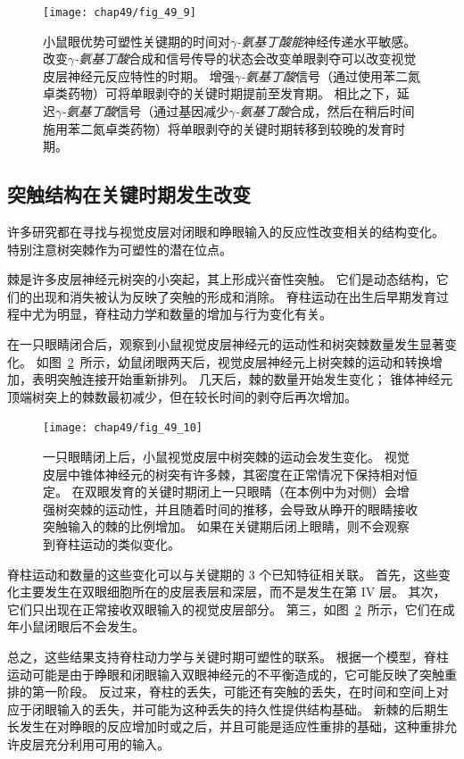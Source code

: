 \begin{figure}[htbp]
	\centering
	\texttt{[image: chap49/fig\_49\_9]}
	\caption{小鼠眼优势可塑性关键期的时间对\textit{$\gamma$-氨基丁酸能}神经传递水平敏感。
		改变\textit{$\gamma$-氨基丁酸}合成和信号传导的状态会改变单眼剥夺可以改变视觉皮层神经元反应特性的时期。
		增强\textit{$\gamma$-氨基丁酸}信号（通过使用苯二氮卓类药物）可将单眼剥夺的关键时期提前至发育期。
		相比之下，延迟\textit{$\gamma$-氨基丁酸}信号（通过基因减少\textit{$\gamma$-氨基丁酸}合成，然后在稍后时间施用苯二氮卓类药物）将单眼剥夺的关键时期转移到较晚的发育时期\cite{daw1998critical}。}
	\label{fig:49_9}
\end{figure}



\subsection{突触结构在关键时期发生改变}

许多研究都在寻找与视觉皮层对闭眼和睁眼输入的反应性改变相关的结构变化。
特别注意树突棘作为可塑性的潜在位点。


棘是许多皮层神经元树突的小突起，其上形成兴奋性突触。
它们是动态结构，它们的出现和消失被认为反映了突触的形成和消除。
脊柱运动在出生后早期发育过程中尤为明显，脊柱动力学和数量的增加与行为变化有关。


在一只眼睛闭合后，观察到小鼠视觉皮层神经元的运动性和树突棘数量发生显著变化。
如图~\ref{fig:49_10}~所示，幼鼠闭眼两天后，视觉皮层神经元上树突棘的运动和转换增加，表明突触连接开始重新排列。
几天后，棘的数量开始发生变化；
锥体神经元顶端树突上的棘数最初减少，但在较长时间的剥夺后再次增加。


\begin{figure}[htbp]
	\centering
	\texttt{[image: chap49/fig\_49\_10]}
	\caption{一只眼睛闭上后，小鼠视觉皮层中树突棘的运动会发生变化。
		视觉皮层中锥体神经元的树突有许多棘，其密度在正常情况下保持相对恒定。
		在双眼发育的关键时期闭上一只眼睛（在本例中为对侧）会增强树突棘的运动性，并且随着时间的推移，会导致从睁开的眼睛接收突触输入的棘的比例增加。
		如果在关键期后闭上眼睛，则不会观察到脊柱运动的类似变化\cite{oray2004dendritic}。}
	\label{fig:49_10}
\end{figure}


脊柱运动和数量的这些变化可以与关键期的 3 个已知特征相关联。
首先，这些变化主要发生在双眼细胞所在的皮层表层和深层，而不是发生在第 IV 层。
其次，它们只出现在正常接收双眼输入的视觉皮层部分。
第三，如图~\ref{fig:49_10}~所示，它们在成年小鼠闭眼后不会发生。


总之，这些结果支持脊柱动力学与关键时期可塑性的联系。
根据一个模型，脊柱运动可能是由于睁眼和闭眼输入双眼神经元的不平衡造成的，它可能反映了突触重排的第一阶段。
反过来，脊柱的丢失，可能还有突触的丢失，在时间和空间上对应于闭眼输入的丢失，并可能为这种丢失的持久性提供结构基础。
新棘的后期生长发生在对睁眼的反应增加时或之后，并且可能是适应性重排的基础，这种重排允许皮层充分利用可用的输入。



